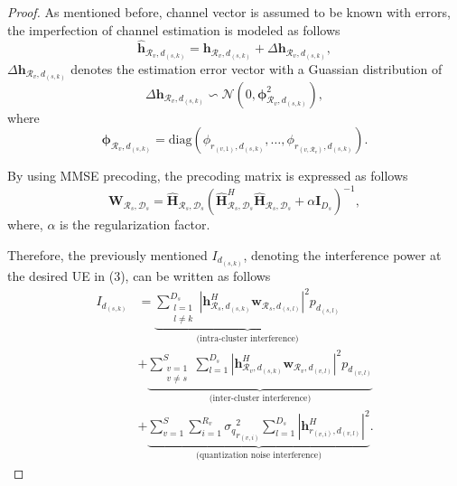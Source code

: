 \documentclass[journal,onecolumn,11pt,draftcls,doublespace]{IEEEtran}
\begin{document}
\begin{proof}
As mentioned before, channel vector is assumed to be known with errors, the imperfection of channel estimation is modeled as follows
\begin{equation*}
\hat{\boldsymbol{h}}_{\mathcal{R}_v,d_{(s,k)}} = \boldsymbol{h}_{\mathcal{R}_v,d_{(s,k)}} + \Delta \boldsymbol{h}_{\mathcal{R}_v,d_{(s,k)}},
\end{equation*}
$\Delta \boldsymbol{h}_{\mathcal{R}_v,d_{(s,k)}}$ denotes the estimation error vector with a Guassian distribution of
$$\Delta \boldsymbol{h}_{\mathcal{R}_v,d_{(s,k)}}\backsim \mathcal{N}(0,\boldsymbol{\phi}_{\mathcal{R}_v,d_{(s,k)}}^2),$$
where 
$$\boldsymbol{\phi}_{\mathcal{R}_v,d_{(s,k)}} = \text{diag}(\phi_{r_{(v,1)},d_{(s,k)}},\ldots,\phi_{r_{(v,\mathcal{R}_v)},d_{(s,k)}}).$$


By using MMSE precoding, the precoding matrix is expressed as follows
\begin{equation}
\boldsymbol{W}_{\mathcal{R}_s,\mathcal{D}_s} = \hat{\boldsymbol{H}}_{\mathcal{R}_s,\mathcal{D}_s}(\hat{\boldsymbol{H}}_{\mathcal{R}_s,\mathcal{D}_s}^H \hat{\boldsymbol{H}}_{\mathcal{R}_s,\mathcal{D}_s}+ \alpha \boldsymbol{I}_{{D}_s})^{-1},
\end{equation} 
where, $\alpha$ is the regularization factor.


Therefore, the previously mentioned $I_{d_{(s,k)}}$, denoting the interference power at the desired UE in (3), can be written as follows
\begin{equation}\label{6}
\begin{split}
I_{d_{(s,k)}} &=  \underbrace{\sum_{\substack{l=1 \\ l\neq k}}^{{D}_s} |\boldsymbol{h}_{\mathcal{R}_s, d_{(s,k)}}^H \boldsymbol{w}_{\mathcal{R}_{s},d_{(s,l)}}|^2  p_{d_{(s,l)}}}_{\text{(intra-cluster interference)}}\\
&+\underbrace{\sum_{\substack{v=1 \\ v\neq s}}^{S} \sum_{l=1}^{{D}_s} |\boldsymbol{h}_{\mathcal{R}_v, d_{(s,k)}}^H \boldsymbol{w}_{\mathcal{R}_{v},d_{(v,l)}}|^2 p_{d_{(v,l)}}}_{\text{(inter-cluster interference)}}\\
& +\underbrace{ \sum_{v=1}^{S} \sum_{i=1}^{{R}_v} {\sigma_q}_{r_{(v,i)}}^2 \sum_{l=1}^{{D}_s} |\boldsymbol{h}_{r_{(v,i)}, d_{(v,l)}}^H|^2 }_{\text{(quantization noise interference)}}.
\end{split}
\end{equation}

 \end{proof}
\end{document}
